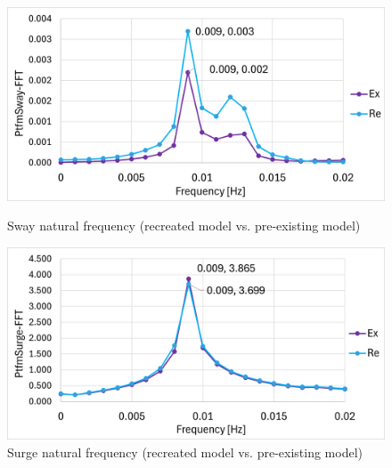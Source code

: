 \documentclass[a4paper, 11pt]{article}
\begin{document}
\begin{figure}[H]
    \begin{minipage}{0.47\textwidth}
        \centering
        \includegraphics[width=1\textwidth]{nat_freq_sway_1.png}
        \caption{\small Sway natural frequency (recreated model vs. pre-existing model)}
        \label{fig:nat_freq_sway_recreated}
    \end{minipage}
    \hfill
    \begin{minipage}{0.48\textwidth}
        \centering
        \includegraphics[width=1\textwidth]{nat_freq_surge_1.png}
        \caption{\small Surge natural frequency (recreated model vs. pre-existing model)}
        \label{fig:nat_freq_surge_recreated}
    \end{minipage}
\end{figure}
\end{document}
